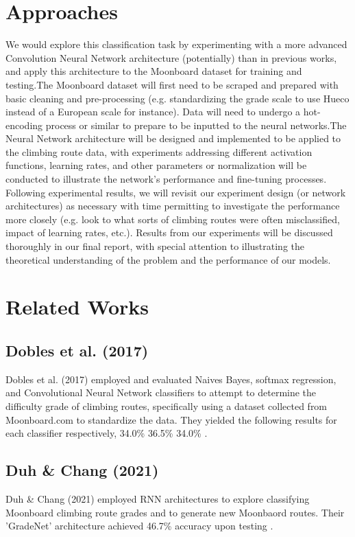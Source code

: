 \documentclass[10pt]{article}
\begin{document}
\section{Approaches}
We would explore this classification task by experimenting with a more advanced
Convolution Neural Network architecture (potentially) than in previous works,
and apply this architecture to the Moonboard dataset for training and
testing.The Moonboard dataset will first need to be scraped and prepared with
basic cleaning and pre-processing (e.g. standardizing the grade scale to use
Hueco instead of a European scale for instance). Data will need to undergo a
hot-encoding process or similar to prepare to be inputted to the neural
networks.The Neural Network architecture will be designed and implemented to be
applied to the climbing route data, with experiments addressing different
activation functions, learning rates, and other parameters or normalization
will be conducted to illustrate the network's performance and fine-tuning
processes. Following experimental results, we will revisit our experiment
design (or network architectures) as necessary with time permitting to
investigate the performance more closely (e.g. look to what sorts of climbing
routes were often misclassified, impact of learning rates, etc.). Results from
our experiments will be discussed thoroughly in our final report, with special
attention to illustrating the theoretical understanding of the problem and the
performance of our models.

\section{Related Works}
\subsection{Dobles et al. (2017)}
Dobles et al. (2017) employed and evaluated Naives Bayes, softmax regression,
and Convolutional Neural Network classifiers to attempt to determine the
difficulty grade of climbing routes, specifically using a dataset collected
from Moonboard.com to standardize the data. They yielded the following
results for each classifier respectively, 34.0\% 36.5\% 34.0\% \cite{dobles_sarmiento_satterthwaite_2017}.

\subsection{Duh \& Chang (2021)}
Duh \& Chang (2021) employed RNN architectures to explore classifying
Moonboard climbing route grades and to generate new Moonbaord routes. Their
'GradeNet' architecture achieved 46.7\% accuracy upon testing \cite{DBLP:journals/corr/abs-2102-01788}.
\end{document}
